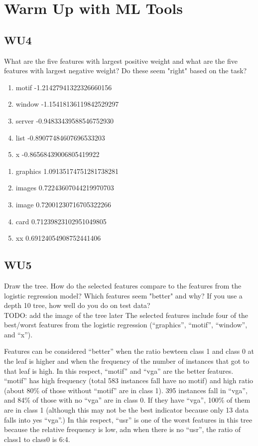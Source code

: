 \documentclass[a4paper,11pt]{article}
\begin{document}
\section{Warm Up with ML Tools}
\label{sec:warmup}
\subsection{WU4}
\textsf{What are the five features with largest positive weight and what
are the five features with largest negative weight? Do these seem "right"
based on the task?}\\

\begin{enumerate}
 \item motif -1.21427941322326660156
 \item window -1.15418136119842529297
 \item server -0.94833439588546752930
 \item list -0.89077484607696533203
 \item x -0.86568439006805419922
\end{enumerate}

\begin{enumerate}
 \item graphics 1.09135174751281738281
 \item images 0.72243607044219970703
 \item image 0.72001230716705322266
 \item card 0.71239823102951049805
 \item xx 0.69124054908752441406
\end{enumerate}

\subsection{WU5}
\textsf{ Draw the tree. How do the selected features compare to the
  features from the logistic regression model? Which features seem
  "better" and why? If you use a depth 10 tree, how well do you do on
  test data?}\\
TODO: add the image of the tree later
The selected features include four of the best/worst features from
the logistic regression (``graphics'', ``motif'', ``window'', and ``x'').

Features can be considered ``better'' when the ratio bewteen class 1
and class 0 at the leaf is higher and when the frequency of the number
of instances that got to that leaf is high. In this respect, ``motif''
and ``vga'' are the better features. ``motif'' has high frequency
(total 583 instances fall have no motif) and high ratio (about 80\% of
those without ``motif'' are in class 1).  395 instances fall in
``vga'', and 84\% of those with no ``vga'' are in class 0. If they
have ``vga'', 100\% of them are in class 1 (although this may not be the
best indicator because only 13 data falls into yes ``vga''.) 
In this respect, ``usr'' is one of the worst features in this tree
because the relative frequency is low, adn when there is no ``usr'',
the ratio of class1 to class0 is 6:4.
\end{document}
